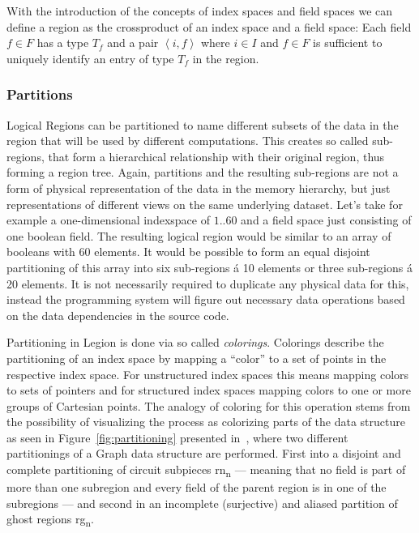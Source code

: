 \documentclass{article}      %
\begin{document}
With the introduction of the concepts of index spaces and field spaces we can define a region as the crossproduct of an index space and a field space: Each field $f \in F$ has a type $T_f$ and a pair $\left< i,f \right>$ where $i \in I$ and $f \in F$ is sufficient to uniquely identify an entry of type $T_f$ in the region.

\subsubsection{Partitions}\label{sec:partitions}
Logical Regions can be partitioned to name different subsets of the data in the region that will be used by different computations. This creates so called sub-regions, that form a hierarchical relationship with their original region, thus forming a region tree.
Again, partitions and the resulting sub-regions are not a form of physical representation of the data in the memory hierarchy, but just representations of different views on the same underlying dataset. Let's take for example a one-dimensional indexspace of $1..60$ and a field space just consisting of one boolean field. The resulting logical region would be similar to an array of booleans with 60 elements. It would be possible to form an equal disjoint partitioning of this array into six sub-regions á 10 elements or three sub-regions á 20 elements. It is not necessarily required to duplicate any physical data for this, instead the programming system will figure out necessary data operations based on the data dependencies in the source code.

Partitioning in Legion is done via so called \emph{colorings}\@. Colorings describe the partitioning of an index space by mapping a ``color'' to a set of points in the respective index space. For unstructured index spaces this means mapping colors to sets of pointers and for structured index spaces mapping colors to one or more groups of Cartesian points. The analogy of coloring for this operation stems from the possibility of visualizing the process as colorizing parts of the data structure as seen in Figure~\hyperref[fig:partitioning]{\ref{fig:partitioning}} presented in~\cite{DependentPartitioning}, where two different partitionings of a Graph data structure are performed. First into a disjoint and complete partitioning of circuit subpieces rn\textsubscript{n} --- meaning that no field is part of more than one subregion and every field of the parent region is in one of the subregions --- and second in an incomplete (surjective) and aliased partition of ghost regions rg\textsubscript{n}.
\end{document}
